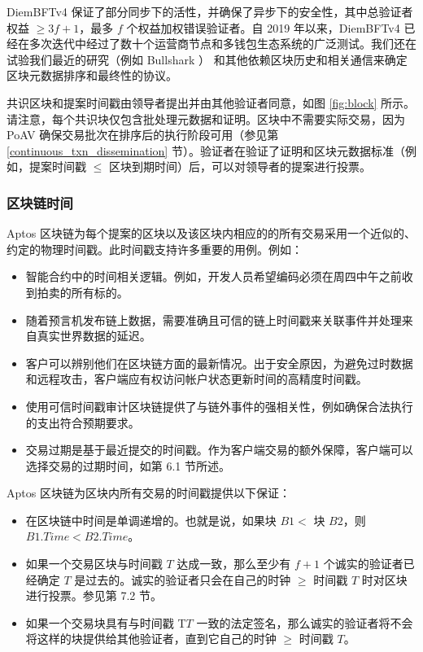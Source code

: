 \documentclass{article}
\begin{document}
DiemBFTv4  保证了部分同步下的活性，并确保了异步下的安全性，其中总验证者权益 $\geq 3f+1$，最多 $f$ 个权益加权错误验证者。自 2019 年以来，DiemBFTv4 已经在多次迭代中经过了数十个运营商节点和多钱包生态系统的广泛测试。我们还在试验我们最近的研究（例如 Bullshark \cite{bullshark}） 和其他依赖区块历史和相关通信来确定区块元数据排序和最终性的协议。

共识区块和提案时间戳由领导者提出并由其他验证者同意，如图 \ref{fig:block} 所示。请注意，每个共识块仅包含批处理元数据和证明。区块中不需要实际交易，因为 PoAV 确保交易批次在排序后的执行阶段可用（参见第 \ref{continuous_txn_dissemination} 节）。验证者在验证了证明和区块元数据标准（例如，提案时间戳 $\le$ 区块到期时间）后，可以对领导者的提案进行投票。

\subsubsection{区块链时间}
\label{subsubsec:blockchain_time}

Aptos 区块链为每个提案的区块以及该区块内相应的的所有交易采用一个近似的、约定的物理时间戳。此时间戳支持许多重要的用例。例如： 
\begin{itemize}

\item 智能合约中的时间相关逻辑。例如，开发人员希望编码必须在周四中午之前收到拍卖的所有标的。

\item 随着预言机发布链上数据，需要准确且可信的链上时间戳来关联事件并处理来自真实世界数据的延迟。

\item 客户可以辨别他们在区块链方面的最新情况。出于安全原因，为避免过时数据和远程攻击，客户端应有权访问帐户状态更新时间的高精度时间戳。

\item 使用可信时间戳审计区块链提供了与链外事件的强相关性，例如确保合法执行的支出符合预期要求。

\item 交易过期是基于最近提交的时间戳。作为客户端交易的额外保障，客户端可以选择交易的过期时间，如第 6.1 节所述。

\end{itemize}

Aptos 区块链为区块内所有交易的时间戳提供以下保证：

\begin{itemize}
\item 在区块链中时间是单调递增的。也就是说，如果块 $B1 < $ 块 $B2$，则 $B1.Time < B2.Time$。

\item 如果一个交易区块与时间戳 $T$ 达成一致，那么至少有 $f+1$ 个诚实的验证者已经确定 $T$ 是过去的。诚实的验证者只会在自己的时钟 $\ge$ 时间戳 $T$ 时对区块进行投票。参见第 7.2 节。

\item 如果一个交易块具有与时间戳 T$T$ 一致的法定签名，那么诚实的验证者将不会将这样的块提供给其他验证者，直到它自己的时钟 $\ge$ 时间戳 $T$。
\end{itemize}
\end{document}
